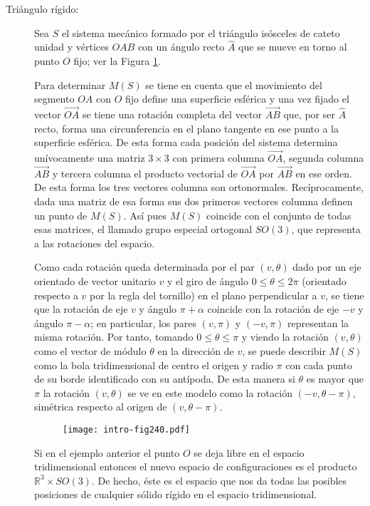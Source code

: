 \documentclass[../VD.tex]{subfiles}
\begin{document}
\begin{description}
\item[Triángulo rígido:] Sea $S$ el sistema mecánico formado por el triángulo
  isósceles de cateto unidad y vértices $OAB$ con un ángulo recto $\widehat{A}$
  que se mueve en torno al punto $O$ fijo; ver la Figura \ref{fig240}.

  Para determinar $M(S)$ se tiene en cuenta que el movimiento del segmento $OA$
  con $O$ fijo define una superficie esférica y una vez fijado el vector
  $\overrightarrow{OA}$ se tiene una rotación completa del vector
  $\overrightarrow{AB}$ que, por ser $\widehat{A}$ recto, forma una
  circunferencia en el plano tangente en ese punto a la superficie esférica. De
  esta forma cada posición del sistema determina unívocamente una matriz
  $3\times 3$ con primera columna $\overrightarrow{OA}$, segunda columna
  $\overrightarrow{AB}$ y tercera columna el producto vectorial de
  $\overrightarrow{OA}$ por $\overrightarrow{AB}$ en ese orden. De esta forma
  los tres vectores columna son ortonormales. Recíprocamente, dada una matriz de
  esa forma sus dos primeros vectores columna definen un punto de $M(S)$. Así
  pues $M(S)$ coincide con el conjunto de todas esas matrices, el llamado grupo
  especial ortogonal $SO(3)$, que representa a las rotaciones del espacio.

  Como cada rotación queda determinada por el par $(v,\theta)$ dado por un eje
  orientado de vector unitario $v$ y el giro de ángulo $0\leq \theta\leq 2\pi$
  (orientado respecto a $v$ por la regla del tornillo) en el plano perpendicular
  a $v$, se tiene que la rotación de eje $v$ y ángulo $\pi+\alpha$ coincide con
  la rotación de eje $-v$ y ángulo $\pi-\alpha$; en particular, los pares
  $(v,\pi)$ y $(-v,\pi)$ representan la misma rotación. Por tanto, tomando
  $0\leq \theta\leq \pi$ y viendo la rotación $(v,\theta)$ como el vector de
  módulo $\theta$ en la dirección de $v$, se puede describir $M(S)$ como la bola
  tridimensional de centro el origen y radio $\pi$ con cada punto de su borde
  identificado con su antípoda. De esta manera si $\theta$ es mayor que $\pi$ la
  rotación $(v,\theta)$ se ve en este modelo como la rotación $(-v,\theta-\pi)$,
  simétrica respecto al origen de $(v,\theta-\pi)$.

  \begin{figure}[ht]
    \centering
    \texttt{[image: intro-fig240.pdf]} %
    \caption{}
    \label{fig240}
  \end{figure}

	Si en el ejemplo anterior el punto $O$ se deja libre en el espacio
  tridimensional entonces el nuevo espacio de configuraciones es el producto
  $\mathbb{R}^3\times SO(3)$. De hecho, éste es el espacio que nos da todas las
  posibles posiciones de cualquier sólido rígido en el espacio tridimensional.
\end{description}
  
\end{document}
